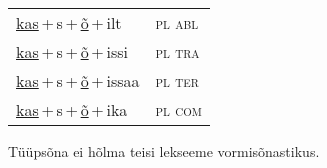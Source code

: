 \begin{minipage}{\textwidth}
\begin{sideways}
\begin{tabular}{l l}
\underline{kas}\,+\,s\,+\,\underline{õ}\,+\,ilt & \textsc{ pl abl } \\
\underline{kas}\,+\,s\,+\,\underline{õ}\,+\,issi & \textsc{ pl tra } \\
\underline{kas}\,+\,s\,+\,\underline{õ}\,+\,issaa & \textsc{ pl ter } \\
\underline{kas}\,+\,s\,+\,\underline{õ}\,+\,ika & \textsc{ pl com } \\
\end{tabular}
\end{sideways}
\label{tab:tüüpsõnamall-kasõ}

\end{minipage}

 
\vspace{1em}
\noindent Tüüpsõna ei hõlma teisi lekseeme vormi\-sõnastikus.
